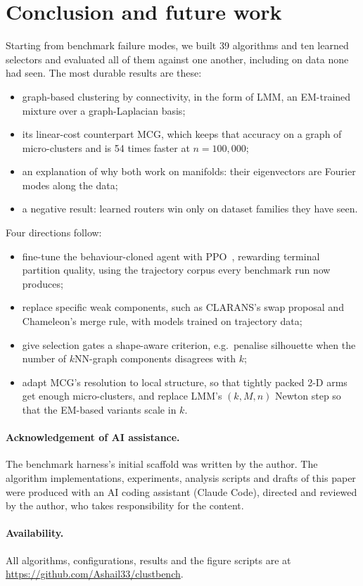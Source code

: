 \documentclass[11pt,a4paper]{article}
\begin{document}
\section{Conclusion and future work}
Starting from benchmark failure modes, we built 39 algorithms and ten
learned selectors and evaluated all of them against one another, including on
data none had seen. The most durable results are these:
\begin{itemize}
  \item graph-based clustering by connectivity, in the form of LMM, an
  EM-trained mixture over a graph-Laplacian basis;
  \item its linear-cost counterpart MCG, which keeps that accuracy on a graph
  of micro-clusters and is 54 times faster at $n = 100{,}000$;
  \item an explanation of why both work on manifolds: their eigenvectors are
  Fourier modes along the data;
  \item a negative result: learned routers win only on dataset families they
  have seen.
\end{itemize}
Four directions follow:
\begin{itemize}
  \item fine-tune the behaviour-cloned agent with
  PPO~\cite{schulman2017proximal}, rewarding terminal partition quality, using
  the trajectory corpus every benchmark run now produces;
  \item replace specific weak components, such as CLARANS's swap proposal and
  Chameleon's merge rule, with models trained on trajectory data;
  \item give selection gates a shape-aware criterion, e.g.\ penalise
  silhouette when the number of $k$NN-graph components disagrees with $k$;
  \item adapt MCG's resolution to local structure, so that tightly packed
  2-D arms get enough micro-clusters, and replace LMM's $(k, M, n)$ Newton
  step so that the EM-based variants scale in $k$.
\end{itemize}

\paragraph{Acknowledgement of AI assistance.} The benchmark harness's
initial scaffold was written by the author. The algorithm implementations,
experiments, analysis scripts and drafts of this paper were produced with an
AI coding assistant (Claude Code), directed and reviewed by the author, who
takes responsibility for the content.

\paragraph{Availability.} All algorithms, configurations, results and the
figure scripts are at \url{https://github.com/Ashail33/clustbench}.



\end{document}
